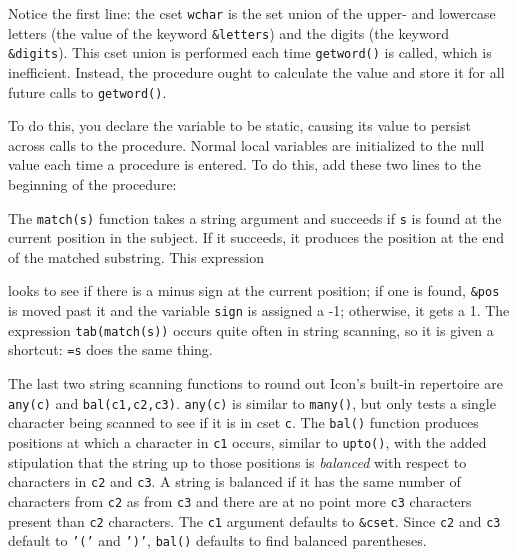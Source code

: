Notice the first line: the cset \texttt{wchar} is the set union of the
upper- and lowercase letters (the value of the keyword
\texttt{\&letters}) and the digits (the keyword \texttt{\&digits}).
This cset union is performed each time \texttt{getword()} is called,
which is inefficient. Instead, the procedure ought to calculate the
value and store it for all future calls to \texttt{getword()}.

To do this, you declare the variable to be static, causing its value to
persist across calls to the procedure. Normal local variables are
initialized to the null value each time a procedure is entered. To do
this, add these two lines to the beginning of the procedure:


The \texttt{match(s)} function takes a string argument
and succeeds if \texttt{s} is found at the current position in the
subject. If it succeeds, it produces the position at the end of the
matched substring. This expression


\noindent
looks to see if there is a minus sign at the current position; if one is
found, \texttt{\&pos} is moved past it and the variable \texttt{sign}
is assigned a -1; otherwise, it gets a 1. The expression
\texttt{tab(match(s))} occurs quite often in string scanning, so it is
given a shortcut: \texttt{=s} does the same thing.

The last two string scanning functions to round out
Icon's built-in repertoire are
\texttt{any(c)} and \texttt{bal(c1,c2,c3)}.
\texttt{any(c)} is similar to \texttt{many()}, but only tests a single
character being scanned to see if it is in cset \texttt{c}. The
\texttt{bal()} function produces positions at which a character in
\texttt{c1} occurs, similar to \texttt{upto()}, with the added
stipulation that the string up to those positions is \textit{balanced}
with respect to characters in \texttt{c2} and \texttt{c3}. A string is
balanced if it has the same number of characters from \texttt{c2} as
from \texttt{c3} and there are at no point more \texttt{c3} characters
present than \texttt{c2} characters. The \texttt{c1} argument defaults
to \texttt{\&cset}. Since \texttt{c2} and \texttt{c3} default to
\texttt{'('} and
\texttt{')'}, \texttt{bal()} defaults
to find balanced parentheses.

